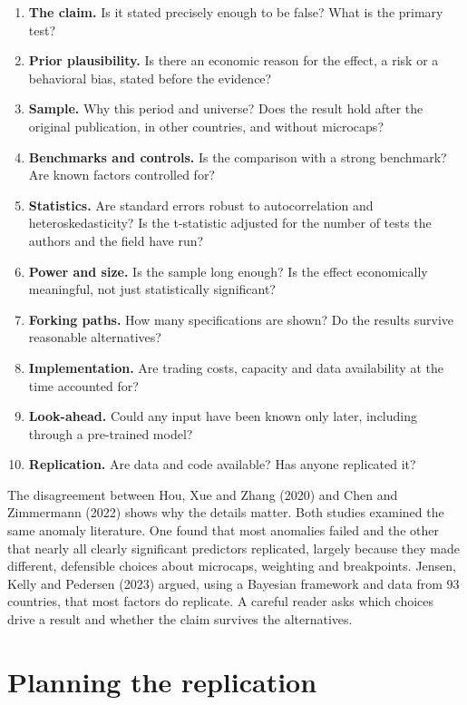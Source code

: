 \begin{enumerate}
  \item \textbf{The claim.} Is it stated precisely enough to be false? What is the primary test?
  \item \textbf{Prior plausibility.} Is there an economic reason for the effect, a risk or a behavioral bias, stated before the evidence?
  \item \textbf{Sample.} Why this period and universe? Does the result hold after the original publication, in other countries, and without microcaps?
  \item \textbf{Benchmarks and controls.} Is the comparison with a strong benchmark? Are known factors controlled for?
  \item \textbf{Statistics.} Are standard errors robust to autocorrelation and heteroskedasticity? Is the t-statistic adjusted for the number of tests the authors and the field have run?
  \item \textbf{Power and size.} Is the sample long enough? Is the effect economically meaningful, not just statistically significant?
  \item \textbf{Forking paths.} How many specifications are shown? Do the results survive reasonable alternatives?
  \item \textbf{Implementation.} Are trading costs, capacity and data availability at the time accounted for?
  \item \textbf{Look-ahead.} Could any input have been known only later, including through a pre-trained model?
  \item \textbf{Replication.} Are data and code available? Has anyone replicated it?
\end{enumerate}

The disagreement between Hou, Xue and Zhang (2020) and Chen and Zimmermann (2022) shows why the details matter. Both studies examined the same anomaly literature. One found that most anomalies failed and the other that nearly all clearly significant predictors replicated, largely because they made different, defensible choices about microcaps, weighting and breakpoints. Jensen, Kelly and Pedersen (2023) argued, using a Bayesian framework and data from 93 countries, that most factors do replicate. A careful reader asks which choices drive a result and whether the claim survives the alternatives.

\section{Planning the replication}
\label{sec:23-planning}

